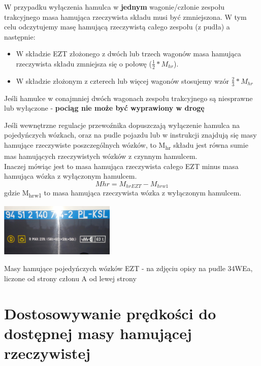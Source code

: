 \begin{tcolorbox}[colback=green!15!white,colframe=green!75!black,title=Zmiana M\textsubscript{hr} po wyłączeniu hamulca zespołu trakcyjnego - wariant 1]
	W przypadku wyłączenia hamulca w \textbf{jednym} wagonie/członie zespołu trakcyjnego masa hamująca rzeczywista składu musi być zmniejszona. W tym celu odczytujemy masę hamującą rzeczywistą całego zespołu (z pudła) a następnie:
	\begin{itemize}
		\item W składzie EZT złożonego z dwóch lub trzech wagonów masa hamująca rzeczywista składu zmniejsza się o połowę ($ \frac{1}{2}*M_{hr} $).
		\item W składzie złożonym z czterech lub więcej wagonów stosujemy wzór $ \frac{2}{3}*M_{hr} $ 
	\end{itemize}
	Jeśli hamulce w conajmniej dwóch wagonach zespołu trakcyjnego są niesprawne lub wyłączone - \textbf{pociąg nie może być wyprawiony w drogę}	
\end{tcolorbox}

\begin{tcolorbox}[colback=yellow!15!white,colframe=green!75!black,title=Zmiana M\textsubscript{hr} po wyłączeniu hamulca zespołu trakcyjnego - wariant 2]
	Jeśli wewnętrzne regulacje przewoźnika dopuszczają wyłączenie hamulca na pojedyńczych wózkach, oraz na pudle pojazdu lub w instrukcji znajdują się masy hamujące rzeczywiste poszczególnych wózków, to M\textsubscript{hr} składu jest równa sumie mas hamujących rzeczywistych wózków z czynnym hamulcem.
	\\ Inaczej mówiąc jest to masa hamująca rzeczywista całego EZT minus masa hamująca wózka z wyłączonym hamulcem.
	\[ M{hr} = M_{hrEZT} - M_{hrw1}  \] gdzie M\textsubscript{hrw1} to masa hamująca rzeczywista wózka z wyłączonym hamulcem.
\end{tcolorbox}
\begin{marginfigure}
	\includegraphics[width=5.5cm]{skryptkierownik-img/mhr-wozki.jpg}
	\caption{Masy hamujące pojedyńczych wózków EZT - na zdjęciu opisy na pudle 34WEa, liczone od strony członu A od lewej strony}
\end{marginfigure}

\section{Dostosowywanie prędkości do dostępnej masy hamującej rzeczywistej}

